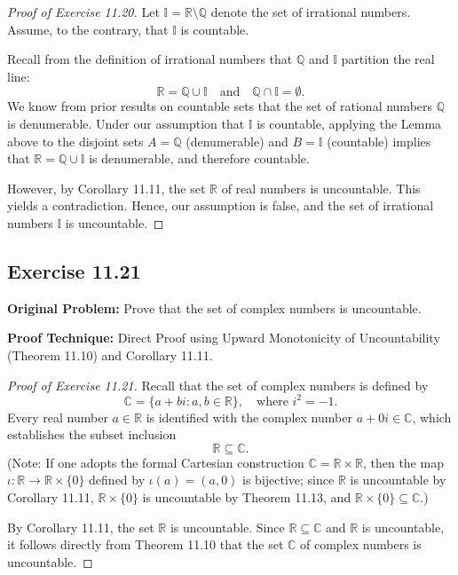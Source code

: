 \documentclass[11pt, letterpaper]{article}
\theoremstyle{definition}
\theoremstyle{remark}
\begin{document}
\begin{proof}[Proof of Exercise 11.20]
Let $\mathbb{I} = \mathbb{R} \setminus \mathbb{Q}$ denote the set of irrational numbers. Assume, to the contrary, that $\mathbb{I}$ is countable.

Recall from the definition of irrational numbers that $\mathbb{Q}$ and $\mathbb{I}$ partition the real line:
\[
\mathbb{R} = \mathbb{Q} \cup \mathbb{I} \quad \text{and} \quad \mathbb{Q} \cap \mathbb{I} = \emptyset.
\]
We know from prior results on countable sets that the set of rational numbers $\mathbb{Q}$ is denumerable. Under our assumption that $\mathbb{I}$ is countable, applying the Lemma above to the disjoint sets $A = \mathbb{Q}$ (denumerable) and $B = \mathbb{I}$ (countable) implies that $\mathbb{R} = \mathbb{Q} \cup \mathbb{I}$ is denumerable, and therefore countable.

However, by Corollary 11.11, the set $\mathbb{R}$ of real numbers is uncountable. This yields a contradiction. Hence, our assumption is false, and the set of irrational numbers $\mathbb{I}$ is uncountable.
\end{proof}

\subsection{Exercise 11.21}

\textbf{Original Problem:} Prove that the set of complex numbers is uncountable.

\medskip
\textbf{Proof Technique:} Direct Proof using Upward Monotonicity of Uncountability (Theorem 11.10) and Corollary 11.11.

\begin{proof}[Proof of Exercise 11.21]
Recall that the set of complex numbers is defined by
\[
\mathbb{C} = \{a + bi : a, b \in \mathbb{R}\}, \quad \text{where } i^2 = -1.
\]
Every real number $a \in \mathbb{R}$ is identified with the complex number $a + 0i \in \mathbb{C}$, which establishes the subset inclusion
\[
\mathbb{R} \subseteq \mathbb{C}.
\]
(Note: If one adopts the formal Cartesian construction $\mathbb{C} = \mathbb{R} \times \mathbb{R}$, then the map $\iota : \mathbb{R} \to \mathbb{R} \times \{0\}$ defined by $\iota(a) = (a, 0)$ is bijective; since $\mathbb{R}$ is uncountable by Corollary 11.11, $\mathbb{R} \times \{0\}$ is uncountable by Theorem 11.13, and $\mathbb{R} \times \{0\} \subseteq \mathbb{C}$.)

By Corollary 11.11, the set $\mathbb{R}$ is uncountable. Since $\mathbb{R} \subseteq \mathbb{C}$ and $\mathbb{R}$ is uncountable, it follows directly from Theorem 11.10 that the set $\mathbb{C}$ of complex numbers is uncountable.
\end{proof}
\end{document}
